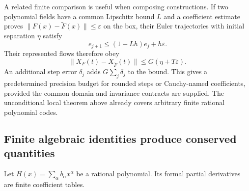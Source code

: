 A related finite comparison is useful when composing constructions.  If
two polynomial fields have a common Lipschitz bound $L$ and a coefficient
estimate proves $\lVert F(x)-\widetilde F(x)\rVert\le\varepsilon$ on the
box, their Euler trajectories with initial separation $\eta$ satisfy
\[
 e_{j+1}\le(1+Lh)e_j+h\varepsilon.
\]
Their represented flows therefore obey
\begin{equation}
 \lVert X_F(t)-X_{\widetilde F}(t)\rVert
       \le G(\eta+T\varepsilon).
 \label{eq:ode-perturbation}
\end{equation}
An additional step error $\delta_j$ adds
$G\sum_j\delta_j$ to the bound.  This gives a predetermined precision
budget for rounded steps or Cauchy-named coefficients, provided the
common domain and invariance contracts are supplied.  The unconditional
local theorem above already covers arbitrary finite rational polynomial
codes.

\subsection{Finite algebraic identities produce conserved quantities}

Let $H(x)=\sum_\alpha b_\alpha x^\alpha$ be a rational polynomial.
Its formal partial derivatives are finite coefficient tables.

